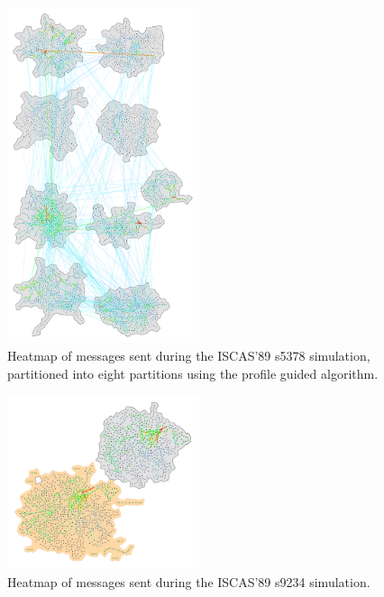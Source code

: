 \documentclass[11pt]{book}
\begin{document}
\begin{figure}
\centering
\includegraphics[clip=true,width=0.5\textwidth]{figs/s5378_8part.pdf}
\caption{Heatmap of messages sent during the ISCAS'89 s5378 simulation, partitioned into eight partitions using the profile guided algorithm.}
\end{figure}

\begin{figure}
\centering
\includegraphics[clip=true,width=0.5\textwidth]{figs/s9234.pdf}
\caption{Heatmap of messages sent during the ISCAS'89 s9234 simulation.}
\end{figure}
\end{document}

